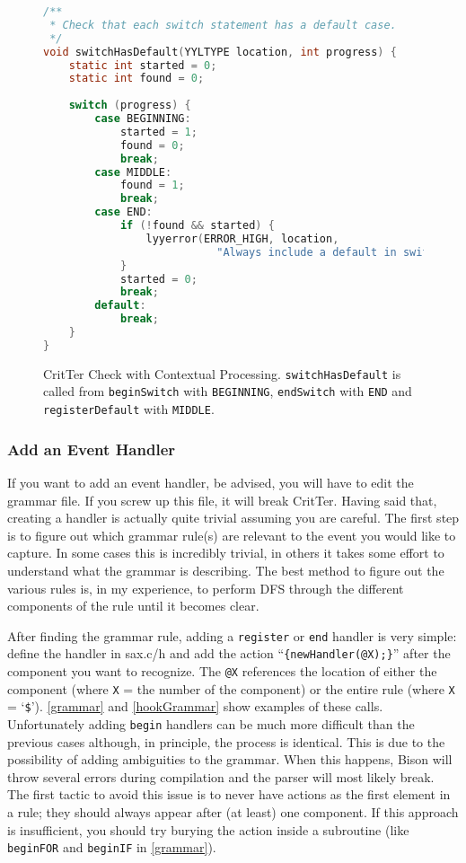 \documentclass[12pt]{report}
\newcommand{\programName}{CritTer\xspace}
\begin{document}
\begin{figure}
\begin{lstlisting}[language=C]
/**
 * Check that each switch statement has a default case.
 */
void switchHasDefault(YYLTYPE location, int progress) {
	static int started = 0;
	static int found = 0;
	
	switch (progress) {
		case BEGINNING:
			started = 1;
			found = 0;
			break;
		case MIDDLE:
			found = 1;
			break;
		case END:
			if (!found && started) {
				lyyerror(ERROR_HIGH, location, 
					       "Always include a default in switch statements");
			}
			started = 0;
			break;
		default: 
			break;
	}
}
\end{lstlisting}
\caption[\programName Check with Contextual Processing]{\programName Check with Contextual Processing. \lstinline{switchHasDefault} is called from \lstinline{beginSwitch} with \lstinline{BEGINNING}, \lstinline{endSwitch} with \lstinline{END} and \lstinline{registerDefault} with \lstinline{MIDDLE}.}
\label{addCheckExample}
\end{figure}

\subsubsection{Add an Event Handler}

If you want to add an event handler, be advised, you will have to edit the grammar file. If you screw up 
this file, it will break \programName. Having said that, creating a handler is actually quite trivial assuming 
you are careful. The first step is to figure out which grammar rule(s) are relevant to the event you would 
like to capture. In some cases this is incredibly trivial, in others it takes some effort to understand what the 
grammar is describing. The best method to figure out the various rules is, in my experience, to perform 
DFS through the different components of the rule until it becomes clear. 

After finding the grammar rule, adding a \lstinline{register} or \lstinline{end} handler is very simple: 
define the handler in sax.c/h and add the action ``\lstinline!{newHandler(@X);}!'' after the component you 
want to recognize. The \lstinline{@X} references the location of either the component (where \lstinline{X} 
= the number of the component) or the entire rule (where \lstinline{X} = `\lstinline{$}'). \autoref{grammar}
 and \autoref{hookGrammar} show examples of these calls. Unfortunately adding 
\lstinline{begin} handlers can be much more difficult than the previous cases although, in principle, the 
process is identical. This is due to the possibility of adding ambiguities to the grammar. When this 
happens, Bison will throw several errors during compilation and the parser will most likely break. The 
first tactic to avoid this issue is to never have actions as the first element in a rule; they should always 
appear after (at least) one component. If this approach is insufficient, you should try burying the 
action inside a subroutine (like \lstinline{beginFOR} and \lstinline{beginIF} in \autoref{grammar}).
\end{document}
